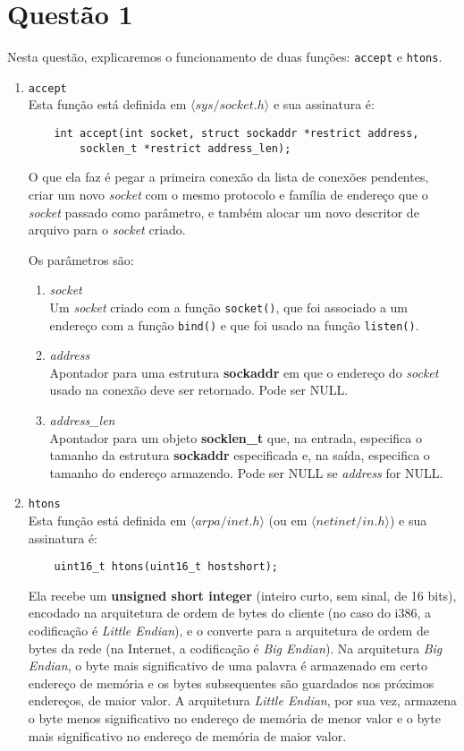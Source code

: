 \documentclass[a4paper,10pt]{article}
\begin{document}
\section{Questão 1}
Nesta questão, explicaremos o funcionamento de duas funções: {\tt accept} e {\tt htons}.
\begin{enumerate}
\item {\tt accept}\\
    Esta função está definida em $\langle sys/socket.h \rangle$ e sua assinatura é:
    \begin{lstlisting}
    int accept(int socket, struct sockaddr *restrict address,
        socklen_t *restrict address_len);
    \end{lstlisting}
    O que ela faz é pegar a primeira conexão da lista de conexões pendentes, criar um novo \textit{socket} com o mesmo protocolo e família de endereço que o \textit{socket} passado como parâmetro, e também alocar um novo descritor de arquivo para o \textit{socket} criado.
    
    Os parâmetros são:
    \begin{enumerate}
        \item \textit{socket}\\
        Um \textit{socket} criado com a função {\tt socket()}, que foi associado a um endereço com a função {\tt bind()} e que foi usado na função {\tt listen()}.
        \item \textit{address}\\
        Apontador para uma estrutura \textbf{sockaddr} em que o endereço do \textit{socket} usado na conexão deve ser retornado. Pode ser NULL.
        \item \textit{address\_len}\\
        Apontador para um objeto \textbf{socklen\_t} que, na entrada, especifica o tamanho da estrutura \textbf{sockaddr} especificada e, na saída, especifica o tamanho do endereço armazendo. Pode ser NULL se \textit{address} for NULL.
    \end{enumerate}
\item {\tt htons}\\
    Esta função está definida em $\langle arpa/inet.h \rangle$ (ou em $\langle netinet/in.h \rangle$) e sua assinatura é:
    \begin{lstlisting}
    uint16_t htons(uint16_t hostshort);
    \end{lstlisting}
    Ela recebe um \textbf{unsigned short integer} (inteiro curto, sem sinal, de 16 bits), encodado na arquitetura de ordem de bytes do cliente (no caso do i386, a codificação é \textit{Little Endian}), e o converte para a arquitetura de ordem de bytes da rede (na Internet, a codificação é \textit{Big Endian}). Na arquitetura \textit{Big Endian}, o byte mais significativo de uma palavra é armazenado em certo endereço de memória e os bytes subsequentes são guardados nos próximos endereços, de maior valor. A arquitetura \textit{Little Endian}, por sua vez, armazena o byte menos significativo no endereço de memória de menor valor e o byte mais significativo no endereço de memória de maior valor.
\end{enumerate}
\end{document}
